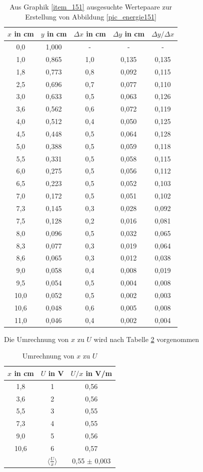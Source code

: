 \begin{table}[H]
 \begin{tabular}{c|c|c|c|c}
$x$ in cm & $y$ in cm & $\Delta x$ in cm& $\Delta y$ in cm & $\Delta y / \Delta x$\\
\hline
0,0&	1,000&	-&	-&	- \\
1,0&	0,865&	1,0&	0,135&	0,135\\
1,8&	0,773&	0,8&	0,092&	0,115\\
2,5&	0,696&	0,7&	0,077&	0,110\\
3,0&	0,633&	0,5&	0,063&	0,126\\
3,6&	0,562&	0,6&	0,072&	0,119\\
4,0&	0,512&	0,4&	0,050&	0,125\\
4,5&	0,448&	0,5&	0,064&	0,128\\
5,0&	0,388&	0,5&	0,059&	0,118\\
5,5&	0,331&	0,5&	0,058&	0,115\\
6,0&	0,275&	0,5&	0,056&	0,112\\
6,5&	0,223&	0,5&	0,052&	0,103\\
7,0&	0,172&	0,5&	0,051&	0,102\\
7,3&	0,145&	0,3&	0,028&	0,092\\
7,5&	0,128&	0,2&	0,016&	0,081\\
8,0&	0,096&	0,5&	0,032&	0,065\\
8,3&	0,077&	0,3&	0,019&	0,064\\
8,6&	0,065&	0,3&	0,012&	0,038\\
9,0&	0,058&	0,4&	0,008&	0,019\\
9,5&	0,054&	0,5&	0,004&	0,008\\
10,0&	0,052&	0,5&	0,002&	0,003\\
10,6&	0,048&	0,6&	0,005&	0,008\\
11,0&	0,046&	0,4&	0,002&	0,004
 \end{tabular}
\caption{Aus Graphik \ref{item_151} ausgesuchte Wertepaare zur Erstellung von Abbildung \ref{pic_energie151}}
\label{tab_energie151}
\end{table}

Die Umrechnung von $x$ zu $U$ wird nach Tabelle \ref{tab_umrech151} vorgenommen
\begin{table}[H]
 \begin{tabular}{c|c|c}
$x$ in cm & $U$ in V & $U/x$ in V/m\\
\hline
1,8&	1&	0,56 \\
3,6&	2&	0,56\\
5,5&	3&	0,55\\
7,3&	4&	0,55\\
9,0&	5&	0,56\\
10,6&	6&	0,57\\
&$\langle \frac{U}{x} \rangle$	&	0,55 $\pm$ 0,003
 \end{tabular}
\caption{Umrechnung von $x$ zu $U$}
\label{tab_umrech151}
\end{table}

